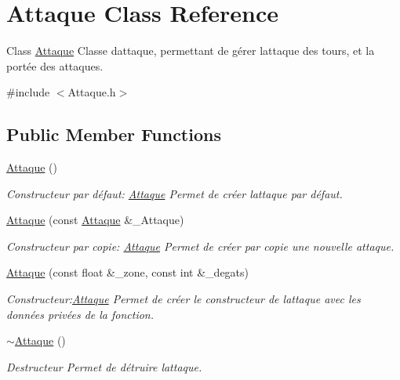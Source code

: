 \hypertarget{classAttaque}{}\section{Attaque Class Reference}
\label{classAttaque}


Class \hyperlink{classAttaque}{Attaque} Classe d\textquotesingle{}attaque, permettant de gérer l\textquotesingle{}attaque des tours, et la portée des attaques.  




{\ttfamily \#include $<$Attaque.\+h$>$}

\subsection*{Public Member Functions}
\begin{DoxyCompactItemize}
\item 
\hyperlink{classAttaque_a1683db1342d1d26f9fc2162ef1975b23}{Attaque} ()
\begin{DoxyCompactList}\small\item\em Constructeur par défaut\+: \hyperlink{classAttaque}{Attaque} Permet de créer l\textquotesingle{}attaque par défaut. \end{DoxyCompactList}\item 
\hyperlink{classAttaque_a1a6b78c3649a5860530da68f9c6bbfbf}{Attaque} (const \hyperlink{classAttaque}{Attaque} \&\+\_\+\+Attaque)
\begin{DoxyCompactList}\small\item\em Constructeur par copie\+: \hyperlink{classAttaque}{Attaque} Permet de créer par copie une nouvelle attaque. \end{DoxyCompactList}\item 
\hyperlink{classAttaque_a103553de7b33d7f8682f9beaa51d878a}{Attaque} (const float \&\+\_\+zone, const int \&\+\_\+degats)
\begin{DoxyCompactList}\small\item\em Constructeur\+:\hyperlink{classAttaque}{Attaque} Permet de créer le constructeur de l\textquotesingle{}attaque avec les données privées de la fonction. \end{DoxyCompactList}\item 
\mbox{\label{classAttaque_a1053986fc93c91f74ea60c898e6fc289}} 
\hyperlink{classAttaque_a1053986fc93c91f74ea60c898e6fc289}{$\sim$\+Attaque} ()
\begin{DoxyCompactList}\small\item\em Destructeur Permet de détruire l\textquotesingle{}attaque. \end{DoxyCompactList}\item 

\end{DoxyCompactItemize}
